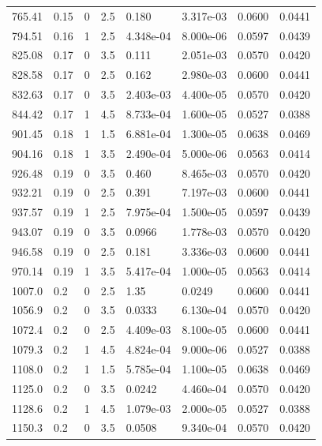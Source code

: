 \documentclass[preview]{standalone}
\begin{document}
{{{\begin{tabular}{L{1.2cm}C{1.2cm} C{0.3cm}C{0.5cm} C{1.4cm}C{1.4cm} C{1.4cm}C{1.4cm}}
  765.41  &  0.15  & 0     & 2.5 &  0.180  & 3.317e-03  & 0.0600 &  0.0441   \\ 
  794.51  &  0.16  & 1     & 2.5 &  4.348e-04  & 8.000e-06  & 0.0597 &  0.0439   \\ 
  825.08  &  0.17  & 0     & 3.5 &  0.111  & 2.051e-03  & 0.0570 &  0.0420   \\ 
  828.58  &  0.17  & 0     & 2.5 &  0.162  & 2.980e-03  & 0.0600 &  0.0441   \\ 
  832.63  &  0.17  & 0     & 3.5 &  2.403e-03  & 4.400e-05  & 0.0570 &  0.0420   \\ 
  844.42  &  0.17  & 1     & 4.5 &  8.733e-04  & 1.600e-05  & 0.0527 &  0.0388   \\ 
  901.45  &  0.18  & 1     & 1.5 &  6.881e-04  & 1.300e-05  & 0.0638 &  0.0469   \\ 
  904.16  &  0.18  & 1     & 3.5 &  2.490e-04  & 5.000e-06  & 0.0563 &  0.0414   \\ 
  926.48  &  0.19  & 0     & 3.5 &  0.460  & 8.465e-03  & 0.0570 &  0.0420   \\ 
  932.21  &  0.19  & 0     & 2.5 &  0.391  & 7.197e-03  & 0.0600 &  0.0441   \\ 
  937.57  &  0.19  & 1     & 2.5 &  7.975e-04  & 1.500e-05  & 0.0597 &  0.0439   \\ 
  943.07  &  0.19  & 0     & 3.5 &  0.0966  & 1.778e-03  & 0.0570 &  0.0420   \\ 
  946.58  &  0.19  & 0     & 2.5 &  0.181  & 3.336e-03  & 0.0600 &  0.0441   \\ 
  970.14  &  0.19  & 1     & 3.5 &  5.417e-04  & 1.000e-05  & 0.0563 &  0.0414   \\ 
  1007.0  &   0.2  & 0     & 2.5 &  1.35  & 0.0249  & 0.0600 &  0.0441   \\ 
  1056.9  &   0.2  & 0     & 3.5 &  0.0333  & 6.130e-04  & 0.0570 &  0.0420   \\ 
  1072.4  &   0.2  & 0     & 2.5 &  4.409e-03  & 8.100e-05  & 0.0600 &  0.0441   \\ 
  1079.3  &   0.2  & 1     & 4.5 &  4.824e-04  & 9.000e-06  & 0.0527 &  0.0388   \\ 
  1108.0  &   0.2  & 1     & 1.5 &  5.785e-04  & 1.100e-05  & 0.0638 &  0.0469   \\ 
  1125.0  &   0.2  & 0     & 3.5 &  0.0242  & 4.460e-04  & 0.0570 &  0.0420   \\ 
  1128.6  &   0.2  & 1     & 4.5 &  1.079e-03  & 2.000e-05  & 0.0527 &  0.0388   \\ 
  1150.3  &   0.2  & 0     & 3.5 &  0.0508  & 9.340e-04  & 0.0570 &  0.0420   \\ 

\end{tabular}}}}
\end{document}
